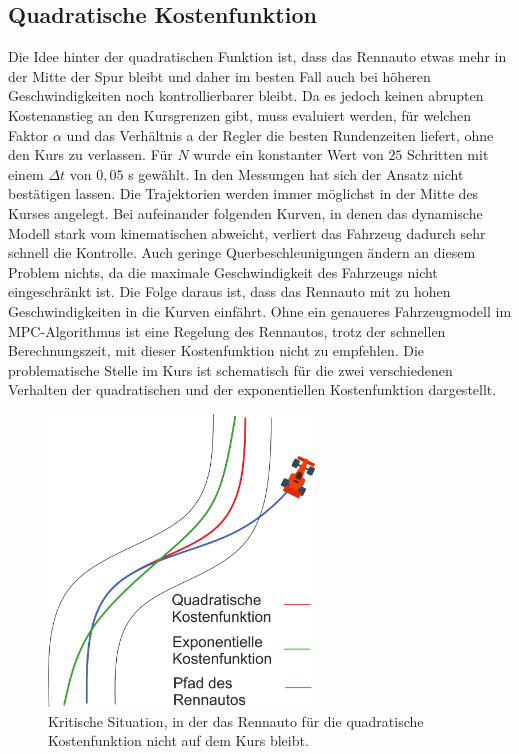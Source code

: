 \documentclass{like}
\begin{document}
\subsection{Quadratische Kostenfunktion}
Die Idee hinter der quadratischen Funktion ist, dass das Rennauto etwas mehr in der Mitte der Spur bleibt und daher im besten Fall auch bei höheren Geschwindigkeiten noch kontrollierbarer bleibt. Da es jedoch keinen abrupten Kostenanstieg an den Kursgrenzen gibt, muss evaluiert werden, für welchen Faktor $\alpha$ und das Verhältnis a der Regler die besten Rundenzeiten liefert, ohne den Kurs zu verlassen. Für $N$ wurde ein konstanter Wert von $25$ Schritten mit einem $\Delta t$ von $0,05$ s gewählt. In den Messungen hat sich der Ansatz nicht bestätigen lassen. Die Trajektorien werden immer möglichst in der Mitte des Kurses angelegt. Bei aufeinander folgenden Kurven, in denen das dynamische Modell stark vom kinematischen abweicht, verliert das Fahrzeug dadurch sehr schnell die Kontrolle. Auch geringe Querbeschleunigungen ändern an diesem Problem nichts, da die maximale Geschwindigkeit des Fahrzeugs nicht eingeschränkt ist. Die Folge daraus ist, dass das Rennauto mit zu hohen Geschwindigkeiten in die Kurven einfährt. Ohne ein genaueres Fahrzeugmodell im \ac{MPC}-Algorithmus ist eine Regelung des Rennautos, trotz der schnellen Berechnungszeit, mit dieser Kostenfunktion nicht zu empfehlen.
Die problematische Stelle im Kurs ist schematisch für die zwei verschiedenen Verhalten der quadratischen und der exponentiellen Kostenfunktion dargestellt. 

\begin{figure}[ht!]
	\centering
	\includegraphics[width=200pt]{Abbildungen/quadraticCostFunction.png}
	\caption{Kritische Situation, in der das Rennauto für die quadratische Kostenfunktion nicht auf dem Kurs bleibt.}
	\label{fig:quadraticCostFunct}
\end{figure}
\end{document}
